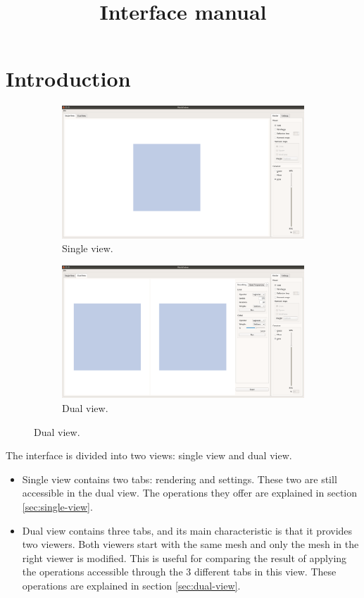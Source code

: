\documentclass[12pt]{article}
\begin{document}
\title{ Interface manual }
\maketitle

\section{Introduction}

\begin{figure}
	\begin{subfigure}{0.5\textwidth}
		\centering
		\includegraphics[scale=0.1]{single-view}
		\caption{Single view.}
	\end{subfigure}
	\begin{subfigure}{0.5\textwidth}
		\centering
		\includegraphics[scale=0.1]{dual-view}
		\caption{Dual view.}
	\end{subfigure}
\end{figure}

The interface is divided into two views: single view and dual view.
\begin{itemize}
	\item Single view contains two tabs: rendering and settings.
	These two are still accessible in the dual view. The operations
	they offer are explained in section \ref{sec:single-view}.
	
	\item Dual view contains three tabs, and its main characteristic
	is that it provides two viewers. Both viewers start with the same
	mesh and only the mesh in the right viewer is modified. This is
	useful for comparing the result of applying the operations accessible
	through the 3 different tabs in this view. These operations are
	explained in section \ref{sec:dual-view}.
\end{itemize}
\end{document}
